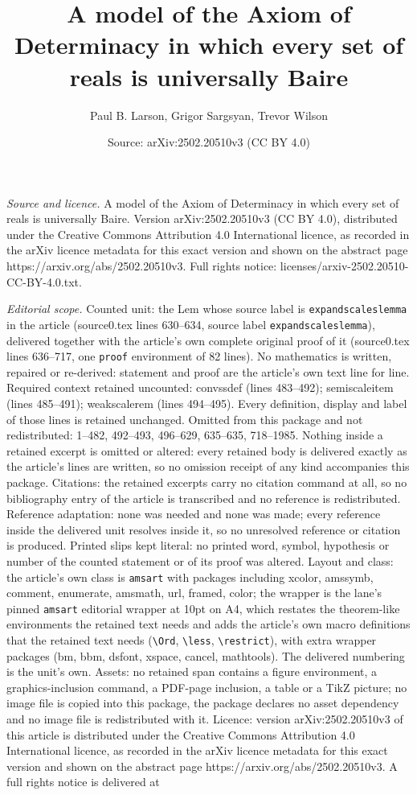 \documentclass[10pt,a4paper]{amsart}
\title[A model of the Axiom of Determinacy in which every set of re]{A model of the Axiom of Determinacy in which every set of reals is universally Baire}
\author{Paul B. Larson, Grigor Sargsyan, Trevor Wilson}
\date{Source: arXiv:2502.20510v3 (CC BY 4.0)}
\begin{document}
\maketitle

\noindent\emph{Source and licence.} A model of the Axiom of Determinacy in which every set of reals is universally Baire. Version arXiv:2502.20510v3 (CC BY 4.0), distributed under the Creative Commons Attribution 4.0 International licence, as recorded in the arXiv licence metadata for this exact version and shown on the abstract page https://arxiv.org/abs/2502.20510v3. Full rights notice: licenses/arxiv-2502.20510-CC-BY-4.0.txt.\par\smallskip

\noindent\textit{Editorial scope.} Counted unit: the Lem whose source label is \texttt{expandscaleslemma} in the article (source0.tex lines 630--634, source label \texttt{expandscaleslemma}), delivered together with the article's own complete original proof of it (source0.tex lines 636--717, one \texttt{proof} environment of 82 lines). No mathematics is written, repaired or re-derived: statement and proof are the article's own text line for line. Required context retained uncounted: convssdef (lines 483--492); semiscaleitem (lines 485--491); weakscalerem (lines 494--495). Every definition, display and label of those lines is retained unchanged. Omitted from this package and not redistributed: 1--482, 492--493, 496--629, 635--635, 718--1985. Nothing inside a retained excerpt is omitted or altered: every retained body is delivered exactly as the article's lines are written, so no omission receipt of any kind accompanies this package. Citations: the retained excerpts carry no citation command at all, so no bibliography entry of the article is transcribed and no reference is redistributed. Reference adaptation: none was needed and none was made; every reference inside the delivered unit resolves inside it, so no unresolved reference or citation is produced. Printed slips kept literal: no printed word, symbol, hypothesis or number of the counted statement or of its proof was altered. Layout and class: the article's own class is \texttt{amsart} with packages including xcolor, amssymb, comment, enumerate, amsmath, url, framed, color; the wrapper is the lane's pinned \texttt{amsart} editorial wrapper at 10pt on A4, which restates the theorem-like environments the retained text needs and adds the article's own macro definitions that the retained text needs (\texttt{\textbackslash Ord}, \texttt{\textbackslash less}, \texttt{\textbackslash restrict}), with extra wrapper packages (bm, bbm, dsfont, xspace, cancel, mathtools). The delivered numbering is the unit's own. Assets: no retained span contains a figure environment, a graphics-inclusion command, a PDF-page inclusion, a table or a TikZ picture; no image file is copied into this package, the package declares no asset dependency and no image file is redistributed with it. Licence: version arXiv:2502.20510v3 of this article is distributed under the Creative Commons Attribution 4.0 International licence, as recorded in the arXiv licence metadata for this exact version and shown on the abstract page https://arxiv.org/abs/2502.20510v3. A full rights notice is delivered at 
\end{document}
